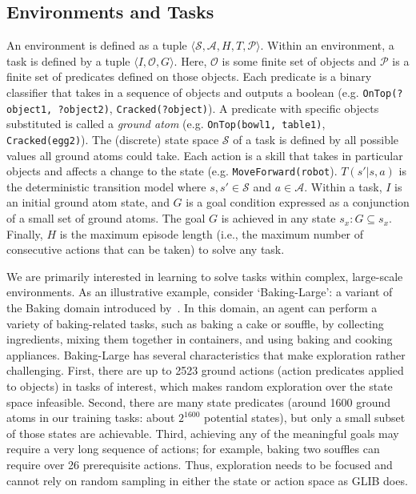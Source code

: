 \subsection{Environments and Tasks}
\label{subsec:envs}
An environment is defined as a tuple $\langle \mathcal{S}, \mathcal{A}, H, T, \mathcal{P} \rangle$.
Within an environment, a task is defined by a tuple $\langle I, \mathcal{O}, G \rangle$. 
Here, $\mathcal{O}$ is some finite set of objects and $\mathcal{P}$ is a finite set of predicates defined on those objects.
Each predicate is a binary classifier that takes in a sequence of objects and outputs a boolean (e.g. \texttt{OnTop(?object1, ?object2)}, \texttt{Cracked(?object)}). A predicate with specific objects substituted is called a \textit{ground atom} (e.g.  \texttt{OnTop(bowl1, table1)}, \texttt{Cracked(egg2)}). The (discrete) state space $\mathcal{S}$ of a task is defined by all possible values all ground atoms could take.
Each action is a skill that takes in particular objects and affects a change to the state (e.g. \texttt{MoveForward(robot}). 
$T(s' | s, a)$ is the deterministic transition model where $s, s' \in \mathcal{S}$ and $a \in \mathcal{A}$. 
Within a task, $I$ is an initial ground atom state, and $G$ is a goal condition expressed as a conjunction of a small set of ground atoms.
The goal $G$ is achieved in any state $s_{x}: G \subseteq s_{x}$.
Finally, $H$ is the maximum episode length (i.e., the maximum number of consecutive actions that can be taken) to solve any task.

We are primarily interested in learning to solve tasks within complex, large-scale environments.
As an illustrative example, consider `Baking-Large': a variant of the Baking domain introduced by~\citet{pddlgym}. In this domain, an agent can perform a variety of baking-related tasks, such as baking a cake or souffle, by collecting ingredients, mixing them together in containers, and using baking and cooking appliances.
Baking-Large has several characteristics that make exploration rather challenging. 
First, there are up to 2523 ground actions (action predicates applied to objects) in tasks of interest, which makes random exploration over the state space infeasible. Second, there are many state predicates (around 1600 ground atoms in our training tasks: about $2^{1600}$ potential states), but only a small subset of those states are achievable. Third, achieving any of the meaningful goals may require a very long sequence of actions; for example, baking two souffles can require over 26 prerequisite actions. Thus, exploration needs to be focused and cannot rely on random sampling in either the state or action space as GLIB does.

